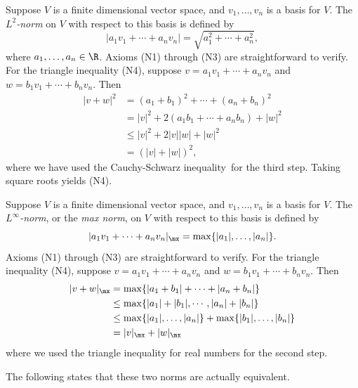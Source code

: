 \begin{example} \label{l2-norm}
	Suppose $V$ is a finite dimensional vector space, and $v_1, \dotsc, v_n$ is a basis for $V$. The \emph{$L^2$-norm} on $V$ with respect to this basis is defined by
	\[ |a_1v_1 + \dotsb + a_n v_n| = \sqrt{a_1^2 + \dotsb + a_n^2}, \]
	where $a_1, \dotsc, a_n \in \R$. 
	Axioms (N1) through (N3) are straightforward to verify. For the triangle inequality (N4), suppose $v = a_1 v_1 + \dotsb + a_n v_n$ and $w = b_1 v_1 + \dotsb +  b_n v_n$. Then
	\[ \begin{aligned} |v + w|^2 &= (a_1 + b_1)^2 + \dotsb + (a_n + b_n)^2 \\
	&= |v|^2 + 2(a_1b_1 + \dotsb + a_n b_n) +  |w|^2 \\
	&\leq |v|^2 + 2|v||w| + |w|^2 \\
	&= (|v| + |w|)^2, \end{aligned} \]
	where we have used the Cauchy-Schwarz inequality\footnotemark\ for the third step. Taking square roots yields (N4). 
\end{example} 


\begin{example} \label{max-norm}
	Suppose $V$ is a finite dimensional vector space, and $v_1, \dotsc, v_n$ is a basis for $V$. The \emph{$L^\infty$-norm}, or the \emph{max norm}, on $V$ with respect to this basis is defined by
	\[ |a_1v_1 + \dotsb + a_n v_n|_\mx = \max \{ |a_1|, \dotsc, |a_n| \}. \]
	Axioms (N1) through (N3) are straightforward to verify. For the triangle inequality (N4), suppose $v = a_1 v_1 + \dotsb + a_n v_n$ and $w = b_1 v_1 + \dotsb +  b_n v_n$. Then
	\[ \begin{aligned} |v +  w|_\mx &= \max\{ |a_1 + b_1| + \dotsb + |a_n + b_n|  \} \\
	&\leq \max\{ |a_1| + |b_1|, \dotsb, |a_n| + |b_n| \} \\
	&\leq \max\{ |a_1|, \dotsc, |a_n|\} + \max\{|b_1|, \dotsc,  |b_n| \} \\
	&= |v|_\mx +  |w|_\mx \end{aligned} \]
	where we used the triangle inequality for real numbers for the second step. 
\end{example}

The following states that these two norms are actually equivalent.  

